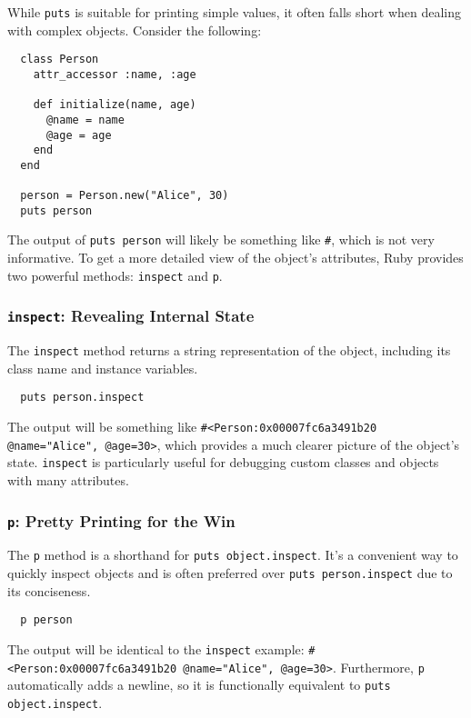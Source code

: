 \documentclass{article}
\begin{document}
{{{{While \texttt{puts} is suitable for printing simple values, it often falls short when dealing with complex objects.  Consider the following:

\begin{verbatim}
  class Person
    attr_accessor :name, :age

    def initialize(name, age)
      @name = name
      @age = age
    end
  end

  person = Person.new("Alice", 30)
  puts person
\end{verbatim}

The output of \texttt{puts person} will likely be something like \texttt{\#<Person:0x00007fc6a3491b20>}, which is not very informative.  To get a more detailed view of the object's attributes, Ruby provides two powerful methods: \texttt{inspect} and \texttt{p}.

\subsubsection*{\texttt{inspect}: Revealing Internal State}

The \texttt{inspect} method returns a string representation of the object, including its class name and instance variables.

\begin{verbatim}
  puts person.inspect
\end{verbatim}

The output will be something like \texttt{\#<Person:0x00007fc6a3491b20 @name="Alice", @age=30>}, which provides a much clearer picture of the object's state.  \texttt{inspect} is particularly useful for debugging custom classes and objects with many attributes.

\subsubsection*{\texttt{p}: Pretty Printing for the Win}

The \texttt{p} method is a shorthand for \texttt{puts object.inspect}.  It's a convenient way to quickly inspect objects and is often preferred over \texttt{puts person.inspect} due to its conciseness.

\begin{verbatim}
  p person
\end{verbatim}

The output will be identical to the \texttt{inspect} example: \texttt{\#<Person:0x00007fc6a3491b20 @name="Alice", @age=30>}.  Furthermore, \texttt{p} automatically adds a newline, so it is functionally equivalent to \texttt{puts object.inspect}.

}}}}
\end{document}
